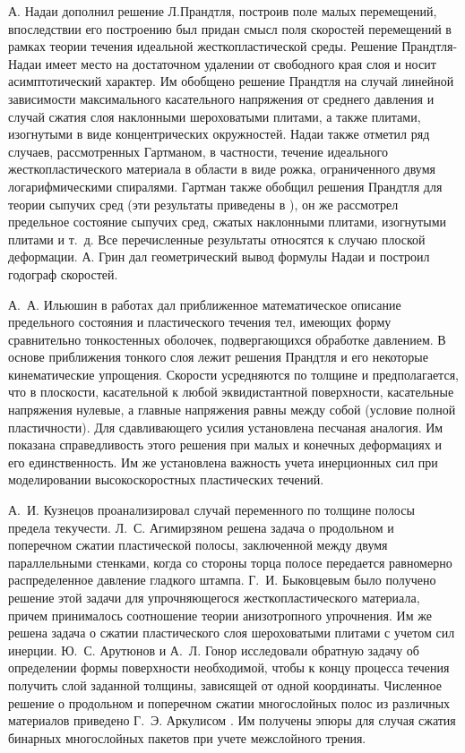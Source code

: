 А. Надаи \autocite{Nadai:1954} дополнил решение Л.Прандтля, построив поле малых перемещений, впоследствии его построению был придан смысл поля скоростей перемещений в рамках теории течения идеальной жесткопластической среды. Решение Прандтля-Надаи имеет место на достаточном удалении от свободного края слоя и носит асимптотический характер. Им обобщено решение Прандтля на случай линейной зависимости максимального касательного напряжения от среднего давления и случай сжатия слоя наклонными шероховатыми плитами, а также плитами, изогнутыми в виде концентрических окружностей. Надаи также отметил ряд случаев, рассмотренных Гартманом, в частности, течение идеального жесткопластического материала в области в виде рожка, ограниченного двумя логарифмическими спиралями. Гартман также обобщил решения Прандтля для теории сыпучих сред (эти результаты приведены в \autocite{Nadai:1969}), он же рассмотрел предельное состояние сыпучих сред, сжатых наклонными плитами, изогнутыми плитами и т.~д. Все перечисленные результаты относятся к случаю плоской деформации.
А. Грин \autocite{Green:1954} дал геометрический вывод формулы Надаи и построил годограф скоростей.

А.~А. Ильюшин в работах \autocite{Ilyushin:1954,Ilyushin:1955} дал приближенное математическое описание предельного состояния и пластического течения тел, имеющих форму сравнительно тонкостенных оболочек, подвергающихся обработке давлением. В основе приближения тонкого слоя лежит решения Прандтля и его некоторые кинематические упрощения. Скорости усредняются по толщине и предполагается, что в плоскости, касательной к любой эквидистантной поверхности, касательные напряжения нулевые, а главные напряжения равны между собой (условие полной пластичности). Для сдавливающего усилия установлена песчаная аналогия. Им показана справедливость этого решения при малых и конечных деформациях и его единственность. Им же \autocite{Ilyushin:2009} установлена важность учета инерционных сил при моделировании высокоскоростных пластических течений.

А.~И. Кузнецов \autocite{Kuznetsov:1960} проанализировал случай переменного по толщине полосы предела текучести.
Л.~С. Агимирзяном \autocite{Agamirzyan:1962} решена задача о продольном и поперечном сжатии пластической полосы, заключенной между двумя параллельными стенками, когда со стороны торца полосе передается равномерно распределенное давление гладкого штампа.
Г.~И. Быковцевым \autocite{Bikovcev:1964} было получено решение этой задачи для упрочняющегося жесткопластического материала, причем принималось соотношение теории анизотропного упрочнения. Им же \autocite{Bikovcev:1960} решена задача о сжатии пластического слоя шероховатыми плитами с учетом сил инерции.
Ю.~С. Арутюнов и А.~Л. Гонор \autocite{Arutyunov:1963} исследовали обратную задачу об определении формы поверхности необходимой, чтобы к концу процесса течения получить слой заданной толщины, зависящей от одной координаты.
Численное решение о продольном и поперечном сжатии многослойных полос из различных материалов приведено Г.~Э. Аркулисом \autocite{Arkulis:1964}. Им получены эпюры для случая сжатия бинарных многослойных пакетов при учете межслойного трения.

